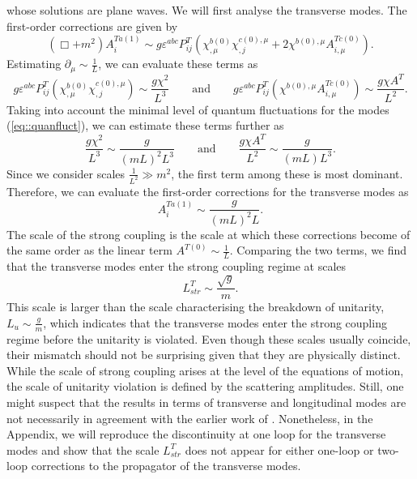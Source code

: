 \documentclass{article}
\begin{document}
whose solutions are plane waves. We will first analyse the transverse modes. The first-order corrections are given by 
\begin{equation}\label{eq::TransCor}
    (\Box+m^2)A_i^{Ta(1)}\sim g\varepsilon^{abc}P_{ij}^T\left(\chi^{b(0)}_{,\mu}\chi^{c(0),\mu}_{,j}+2\chi^{b(0),\mu}A_{i,\mu}^{Tc(0)}\right).
\end{equation}
 Estimating $\partial_{\mu}\sim\frac{1}{L}$, we can evaluate these terms as 
\begin{equation}
   g\varepsilon^{abc}P_{ij}^T\left( \chi^{b(0)}_{,\mu}\chi^{c(0),\mu}_{,j}\right)\sim\frac{g\chi^2}{L^3}\qquad\text{and}\qquad  g\varepsilon^{abc}P_{ij}^T\left(\chi^{b(0),\mu}A_{i,\mu}^{Tc(0)}\right)\sim\frac{g\chi A^T}{L^2}.
\end{equation}
Taking into account the minimal level of quantum fluctuations for the modes (\ref{eq::quanfluct}), we can estimate these terms further as
\begin{equation}
    \frac{g\chi^2}{L^3}\sim\frac{g}{\left(mL\right)^2L^3}\qquad\text{and}\qquad\frac{g\chi A^T}{L^2}\sim\frac{g}{\left(mL\right)L^3}.
\end{equation}
Since we consider scales $\frac{1}{L^2}\gg m^2$, the first term among these is most dominant. Therefore, we can evaluate the first-order corrections for the transverse modes as  
\begin{equation}
    A_i^{Ta(1)}\sim\frac{g}{\left(mL\right)^2L}.
\end{equation}
The scale of the strong coupling is the scale at which these corrections become of the same order as the linear term $A^{T(0)}\sim\frac{1}{L}$. Comparing the two terms, we find that the transverse modes enter the strong coupling regime at scales  
\begin{equation}
    L_{str}^T\sim\frac{\sqrt{g}}{m}.
\end{equation}
This scale is larger than the scale characterising the breakdown of unitarity, $L_u\sim\frac{g}{m}$, which indicates that the transverse modes enter the strong coupling regime before the unitarity is violated. Even though these scales usually coincide, their mismatch should not be surprising given that they are physically distinct. While the scale of strong coupling arises at the level of the equations of motion, the scale of unitarity violation is defined by the scattering amplitudes. Still, one might suspect that the results in terms of transverse and longitudinal modes are not necessarily in agreement with the earlier work of \cite{vDVZ, Veltman1968, Veltman1970}. Nonetheless, in the Appendix, we will reproduce the discontinuity at one loop for the transverse modes and show that the scale $L_{str}^T$ does not appear for either one-loop or two-loop corrections to the propagator of the transverse modes. 
\end{document}
